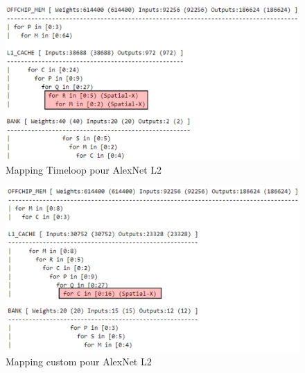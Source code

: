 \documentclass[11pt,letterpaper]{article}
\begin{document}
    \begin{figure}[H]
        \centering
        \includegraphics[width=0.9\linewidth]{map_timeloop_alex_L2.png}
        \caption{Mapping Timeloop pour AlexNet L2}
        \label{fig:map_timeloop_alex_L2}
    \end{figure}

    \begin{figure}[H]
        \centering
        \includegraphics[width=0.9\linewidth]{map_custom_alex_L2.png}
        \caption{Mapping custom pour AlexNet L2}
        \label{fig:map_custom_alex_L2}
    \end{figure}
\end{document}
